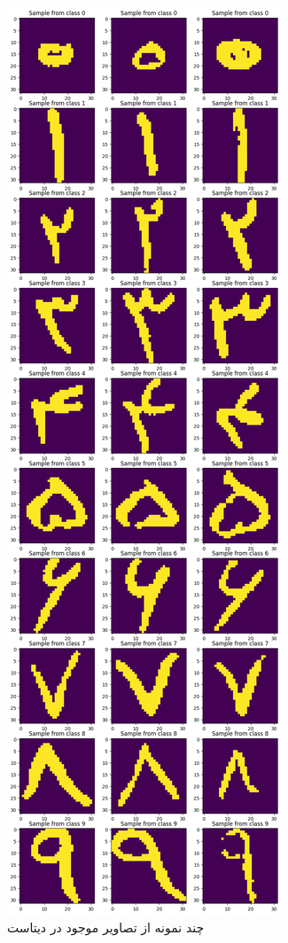 \documentclass[12pt,onecolumn,a4paper]{article}
\begin{document}
\begin{figure}[h!]
    \begin{center}
    \includegraphics[scale=0.27]{q7/Q7_a.png}
    \caption{چند نمونه از تصاویر موجود در دیتاست}
    \label{fig:1}
    \end{center}
\end{figure}
\end{document}
